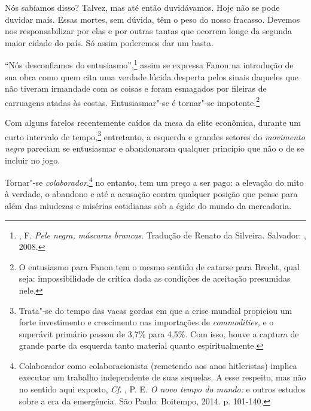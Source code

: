 Nós sabíamos disso? Talvez, mas até então duvidávamos. Hoje não se pode
duvidar mais. Essas mortes, sem dúvida, têm o peso do nosso fracasso.
Devemos nos responsabilizar por elas e por outras tantas que ocorrem
longe da segunda maior cidade do país. Só assim poderemos dar um basta.

``Nós desconfiamos do entusiasmo'',\footnote{, F. \emph{Pele negra,
  máscaras brancas}. Tradução de Renato da Silveira. Salvador: ,
  2008.} assim se expressa Fanon na introdução de sua obra como quem
cita uma verdade lúcida desperta pelos sinais daqueles que não tiveram
irmandade com as coisas e foram esmagados por fileiras de carruagens
atadas às costas. Entusiasmar"-se é tornar"-se impotente.\footnote{O
  entusiasmo para Fanon tem o mesmo sentido de catarse para Brecht, qual
  seja: impossibilidade de crítica dada as condições de aceitação
  presumidas nele.}

Com alguns farelos recentemente caídos da mesa da elite econômica,
durante um curto intervalo de tempo,\footnote{Trata"-se do tempo das vacas
  gordas em que a crise mundial propiciou um forte investimento e
  crescimento nas importações de \emph{commodities,} e o superávit
  primário passou de 3,7\% para 4,5\%. Com isso, houve a captura de
  grande parte da esquerda tanto material quanto espiritualmente.}
entretanto, a esquerda e grandes setores do \emph{movimento negro}
pareciam se entusiasmar e abandonaram qualquer princípio que não o de se
incluir no jogo.

Tornar"-se \emph{colaborador},\footnote{Colaborador como colaboracionista
  (remetendo aos anos hitleristas) implica executar um trabalho
  independente de suas sequelas. A esse respeito, mas não no sentido
  aqui exposto, \emph{Cf}. , P. E. \emph{O novo tempo do mundo:} e
  outros estudos sobre a era da emergência. São Paulo: Boitempo, 2014.
  p. 101-140.} no entanto, tem um preço a ser pago: a elevação do mito
à verdade, o abandono e até a acusação contra qualquer posição que pense
para além das miudezas e misérias cotidianas sob a égide do mundo da
mercadoria.


